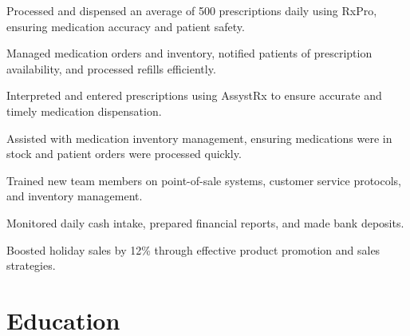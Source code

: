 \documentclass[letterpaper,10pt]{article}
\begin{document}
\begin{resume_list}
\item Processed and dispensed an average of 500 prescriptions daily using RxPro, ensuring medication accuracy and patient safety.
\item Managed medication orders and inventory, notified patients of prescription availability, and processed refills efficiently.
\end{resume_list}

\begin{resume_list}
\item Interpreted and entered prescriptions using AssystRx to ensure accurate and timely medication dispensation.
\item Assisted with medication inventory management, ensuring medications were in stock and patient orders were processed quickly.
\end{resume_list}

\begin{resume_list}
\item Trained new team members on point-of-sale systems, customer service protocols, and inventory management.
\item Monitored daily cash intake, prepared financial reports, and made bank deposits.
\item Boosted holiday sales by 12\% through effective product promotion and sales strategies.
\end{resume_list}

\section{Education}

\vspace{10pt}
\end{document}
